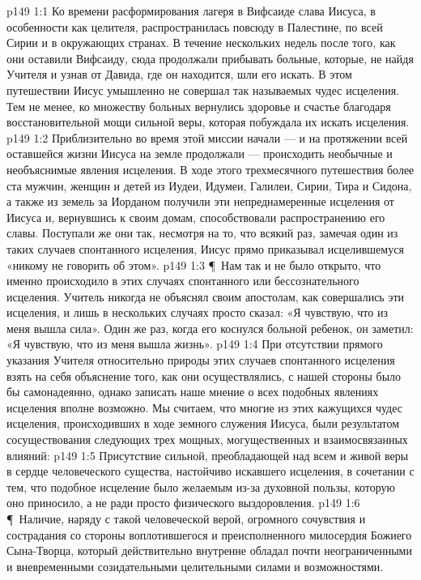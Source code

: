 \vs p149 1:1 Ко времени расформирования лагеря в Вифсаиде слава Иисуса, в особенности как целителя, распространилась повсюду в Палестине, по всей Сирии и в окружающих странах. В течение нескольких недель после того, как они оставили Вифсаиду, сюда продолжали прибывать больные, которые, не найдя Учителя и узнав от Давида, где он находится, шли его искать. В этом путешествии Иисус умышленно не совершал так называемых чудес исцеления. Тем не менее, ко множеству больных вернулись здоровье и счастье благодаря восстановительной мощи сильной веры, которая побуждала их искать исцеления.
\vs p149 1:2 Приблизительно во время этой миссии начали --- и на протяжении всей оставшейся жизни Иисуса на земле продолжали --- происходить необычные и необъяснимые явления исцеления. В ходе этого трехмесячного путешествия более ста мужчин, женщин и детей из Иудеи, Идумеи, Галилеи, Сирии, Тира и Сидона, а также из земель за Иорданом получили эти непреднамеренные исцеления от Иисуса и, вернувшись к своим домам, способствовали распространению его славы. Поступали же они так, несмотря на то, что всякий раз, замечая один из таких случаев спонтанного исцеления, Иисус прямо приказывал исцелившемуся «никому не говорить об этом».
\vs p149 1:3 \P\ Нам так и не было открыто, что именно происходило в этих случаях спонтанного или бессознательного исцеления. Учитель никогда не объяснял своим апостолам, как совершались эти исцеления, и лишь в нескольких случаях просто сказал: «Я чувствую, что из меня вышла сила». Один же раз, когда его коснулся больной ребенок, он заметил: «Я чувствую, что из меня вышла жизнь».
\vs p149 1:4 При отсутствии прямого указания Учителя относительно природы этих случаев спонтанного исцеления взять на себя объяснение того, как они осуществлялись, с нашей стороны было бы самонадеянно, однако записать наше мнение о всех подобных явлениях исцеления вполне возможно. Мы считаем, что многие из этих кажущихся чудес исцеления, происходивших в ходе земного служения Иисуса, были результатом сосуществования следующих трех мощных, могущественных и взаимосвязанных влияний:
\vs p149 1:5 \bibnobreakspace Присутствие сильной, преобладающей над всем и живой веры в сердце человеческого существа, настойчиво искавшего исцеления, в сочетании с тем, что подобное исцеление было желаемым из\hyp{}за духовной пользы, которую оно приносило, а не ради просто физического выздоровления.
\vs p149 1:6 \P\ \bibnobreakspace Наличие, наряду с такой человеческой верой, огромного сочувствия и сострадания со стороны воплотившегося и преисполненного милосердия Божиего Сына\hyp{}Творца, который действительно внутренне обладал почти неограниченными и вневременными созидательными целительными силами и возможностями.
